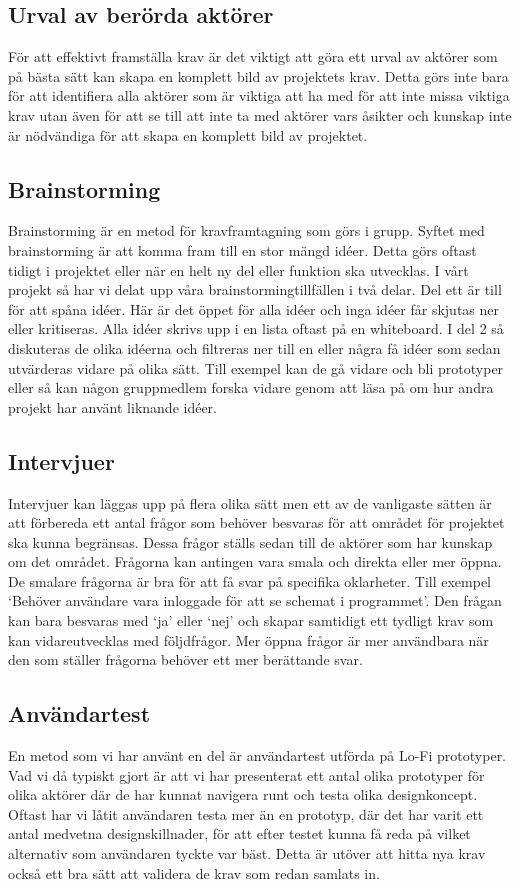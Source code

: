 \subsection{Urval av berörda aktörer}
För att effektivt framställa krav är det viktigt att göra ett urval av aktörer som på bästa sätt kan skapa en komplett bild av projektets krav\cite{cs_choose_right}. Detta görs inte bara för att identifiera alla aktörer som är viktiga att ha med för att inte missa viktiga krav utan även för att se till att inte ta med aktörer vars åsikter och kunskap inte är nödvändiga för att skapa en komplett bild av projektet.

\subsection{Brainstorming}
Brainstorming är en metod för kravframtagning som görs i grupp. Syftet med brainstorming är att komma fram till en stor mängd idéer. Detta görs oftast tidigt i projektet eller när en helt ny del eller funktion ska utvecklas. I vårt projekt så har vi delat upp våra brainstormingtillfällen i två delar. Del ett är till för att spåna idéer. Här är det öppet för alla idéer och inga idéer får skjutas ner eller kritiseras. Alla idéer skrivs upp i en lista oftast på en whiteboard. I del 2 så diskuteras de olika idéerna och filtreras ner till en eller några få idéer som sedan utvärderas vidare på olika sätt. Till exempel kan de gå vidare och bli prototyper eller så kan någon gruppmedlem forska vidare genom att läsa på om hur andra projekt har använt liknande idéer.

\subsection{Intervjuer}\label{sec:ch-intervju}
Intervjuer kan läggas upp på flera olika sätt men ett av de vanligaste sätten är att förbereda ett antal frågor som behöver besvaras för att området för projektet ska kunna begränsas. Dessa frågor ställs sedan till de aktörer som har kunskap om det området. Frågorna kan antingen vara smala och direkta eller mer öppna. De smalare frågorna är bra för att få svar på specifika oklarheter. Till exempel ‘Behöver användare vara inloggade för att se schemat i programmet’. Den frågan kan bara besvaras med ‘ja’ eller ‘nej’ och skapar samtidigt ett tydligt krav som kan vidareutvecklas med följdfrågor. Mer öppna frågor är mer användbara när den som ställer frågorna behöver ett mer berättande svar.

\subsection{Användartest}
En metod som vi har använt en del är användartest utförda på Lo-Fi prototyper. Vad vi då typiskt gjort är att vi har presenterat ett antal olika prototyper för olika aktörer där de har kunnat navigera runt och testa olika designkoncept. Oftast har vi låtit användaren testa mer än en prototyp, där det har varit ett antal medvetna designskillnader, för att efter testet kunna få reda på vilket alternativ som användaren tyckte var bäst. Detta är utöver att hitta nya krav också ett bra sätt att validera de krav som redan samlats in.

